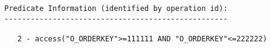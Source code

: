 \documentclass[11pt,a4paper,parskip=half]{scrartcl}
\begin{document}
\begin{lstlisting}
Predicate Information (identified by operation id):                                                                                                                                                                                                                                                          
---------------------------------------------------                                                                                                                                                                                                                                                          
                                                                                                                                                                                                                                                                                                             
   2 - access("O_ORDERKEY">=111111 AND "O_ORDERKEY"<=222222)                                                                                                                                                                                                                                                 
\end{lstlisting}
\end{document}
